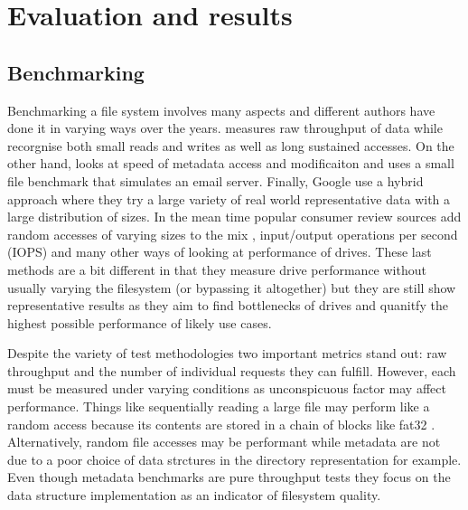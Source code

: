 \chapter{Evaluation and results}

    \section{Benchmarking}
        \label{sec:benchmark}

        Benchmarking a file system involves many aspects and different authors
        have done it in varying ways over the years. \citeauthor{FFS} measures
        raw throughput of data while \citeauthor{LFS} recorgnise both small
        reads and writes as well as long sustained accesses.  On the other
        hand, \citeauthor{soft_updates} looks at speed of metadata access and
        modificaiton and \citeauthor{ext4_space_maps} uses a small file
        benchmark that simulates an email server. Finally, Google use a hybrid
        approach where they try a large variety of real world representative
        data with a large distribution of sizes. In the mean time popular
        consumer review sources add random accesses of varying sizes to the mix
        \cite{servethehome_review}, input/output operations per second (IOPS)
        \cite{tomshardware_review} and many other ways of looking at
        performance of drives. These last methods are a bit different in that
        they measure drive performance without usually varying the filesystem
        (or bypassing it altogether) but they are still show representative
        results as they aim to find bottlenecks of drives and quanitfy the
        highest possible performance of likely use cases.

        Despite the variety of test methodologies two important metrics stand
        out: raw throughput and the number of individual requests they can
        fulfill. However, each must be measured under varying conditions as
        unconspicuous factor may affect performance. Things like sequentially
        reading a large file may perform like a random access because its
        contents are stored in a chain of blocks like fat32 \cite{fat32}.
        Alternatively, random file accesses may be performant while metadata
        are not due to a poor choice of data strctures in the directory
        representation for example. Even though metadata benchmarks are pure
        throughput tests they focus on the data structure implementation as an
        indicator of filesystem quality.

